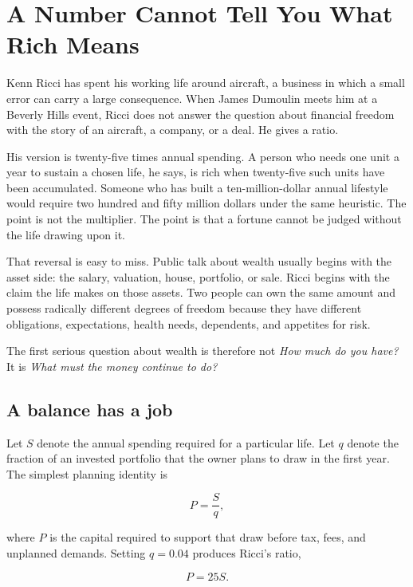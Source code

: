\chapter{A Number Cannot Tell You What Rich Means}

Kenn Ricci has spent his working life around aircraft, a business in which a
small error can carry a large consequence. When James Dumoulin meets him at a
Beverly Hills event, Ricci does not answer the question about financial freedom
with the story of an aircraft, a company, or a deal. He gives a ratio.

His version is twenty-five times annual spending. A person who needs one unit a
year to sustain a chosen life, he says, is rich when twenty-five such units have
been accumulated. Someone who has built a ten-million-dollar annual lifestyle
would require two hundred and fifty million dollars under the same heuristic.
The point is not the multiplier. The point is that a fortune cannot be judged
without the life drawing upon it.

That reversal is easy to miss. Public talk about wealth usually begins with the
asset side: the salary, valuation, house, portfolio, or sale. Ricci begins with
the claim the life makes on those assets. Two people can own the same amount and
possess radically different degrees of freedom because they have different
obligations, expectations, health needs, dependents, and appetites for risk.

The first serious question about wealth is therefore not \emph{How much do you
have?} It is \emph{What must the money continue to do?}

\section{A balance has a job}

Let $S$ denote the annual spending required for a particular life. Let $q$
denote the fraction of an invested portfolio that the owner plans to draw in
the first year. The simplest planning identity is

\begin{equation}
P = \frac{S}{q},
\end{equation}

where $P$ is the capital required to support that draw before tax, fees, and
unplanned demands. Setting $q=0.04$ produces Ricci's ratio,

\begin{equation}
P = 25S.
\end{equation}

